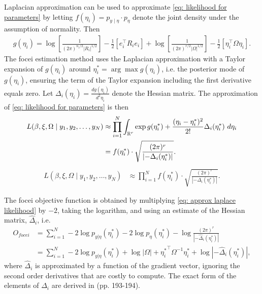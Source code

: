 Laplacian approximation can be used to approximate \eqref{eq: likelihood for parameters} by letting $f(\eta_i)=p_{y\mid  \eta}\cdot p_\eta$ denote the joint density under the assumption of normality. Then
\begin{align*}
    g(\eta_i)=\log\left[\frac{1}{(2\pi)^{n_i/2}|R_i|^{1/2}}\right]-\frac{1}{2}\left[e_i^\top R_i e_i\right] + \log \left[\frac{1}{(2\pi)^{r/2}|\Omega|^{1/2}}\right] -\frac{1}{2}\left[\eta_i^\top \Omega \eta_i\right].
\end{align*}
The focei estimation method uses the Laplacian approximation with a Taylor expansion of $g(\eta_i)$ around $\eta_i^\ast = \arg \max g(\eta_i)$, i.e. the posterior mode of $g(\eta_i)$, ensuring the term of the Taylor expansion including the first derivative equals zero. Let $\Delta_i(\eta_i)=\frac{d g(\eta_i)}{d^2 \eta_i}$ denote the Hessian matrix.
The approximation of \eqref{eq: likelihood for parameters} is then
\begin{align}
    L(\beta,\xi,\Omega\mid  y_1,y_2,\dots,y_N)&\approx \prod_{i=1}^N\int_{\mathbb{R}^r} \exp g(\eta_i^\ast) +\frac{(\eta_i-\eta_i^\ast)^2}{2!} \Delta_i(\eta_i^\ast)\ d\eta_i \\
    &= f(\eta_i^\ast) \cdot \sqrt{\frac{(2\pi)^r}{\left|-\Delta_i(\eta_i^\ast)\right|}}.
\end{align}
\begin{align}
    L(\beta,\xi,\Omega\mid  y_1,y_2,\dots,y_N)&\approx \prod_{i=1}^N f(\eta_i^\ast) \cdot \sqrt{\frac{(2\pi)^r}{\left|-\Delta_i(\eta_i^\ast)\right|}}. \label{eq: approx laplace likelihood}
\end{align}

The focei objective function is obtained by multiplying \eqref{eq: approx laplace likelihood} by $-2$, taking the logarithm, and using an estimate of the Hessian matrix, $\hat\Delta_i$, i.e.
\begin{align*}
    O_{focei}&=\sum_{i=1}^N -2\log p_{y|\eta}(\eta_i^\ast)-2\log p_\eta(\eta_i^\ast)-\log \frac{(2\pi)^r}{\left|-\hat\Delta_i(\eta_i^\ast)\right|}\\
    &= \sum_{i=1}^N-2\log p_{y|\eta}(\eta_i^\ast) +\log|\Omega|+{\eta_i^\ast}^\top \Omega^{-1} \eta_i^\ast +\log \left|-\hat\Delta_i(\eta_i^\ast)\right|,
\end{align*}
where $\hat\Delta_i$ is approximated 
by a function of the gradient vector, ignoring the second order derivatives that are costly to compute. The exact form of the elements of $\hat\Delta_i$ are derived in \cite{Almquist2015} (pp. 193-194).


